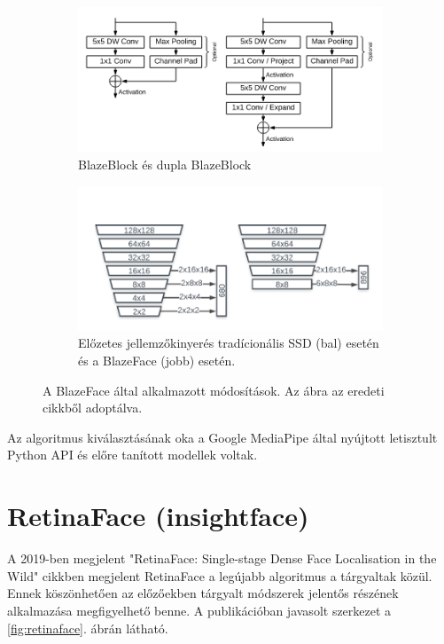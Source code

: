 \begin{figure}[h]
    \centering
    \begin{subfigure}[b]{0.45\linewidth}
        \includegraphics[width=\linewidth]{figures/blaze_block.png}
        \caption{BlazeBlock és dupla BlazeBlock}
    \end{subfigure}
    \begin{subfigure}[b]{0.45\linewidth}
        \includegraphics[width=\linewidth]{figures/blazeface_anchor_computation_vs_ssd.png}
        \caption{Előzetes jellemzőkinyerés tradícionális SSD (bal) esetén és a BlazeFace (jobb) esetén.}
    \end{subfigure}
    \caption{A BlazeFace által alkalmazott módosítások. Az ábra az eredeti cikkből\cite{bazarevsky_blazeface_2019} adoptálva.}
    \label{fig:blazeface}
\end{figure}

Az algoritmus kiválasztásának oka a Google MediaPipe\cite{noauthor_mediapipe_nodate} által nyújtott letisztult Python API és előre tanított modellek voltak. 

\section{RetinaFace (insightface)}
A 2019-ben megjelent "RetinaFace: Single-stage Dense Face Localisation in the Wild"\cite{deng_retinaface_2019} cikkben megjelent RetinaFace a legújabb algoritmus a tárgyaltak közül. Ennek köszönhetően az előzőekben tárgyalt módszerek jelentős részének alkalmazása megfigyelhető benne. A publikációban javasolt szerkezet a
\ref{fig:retinaface}. ábrán látható.

